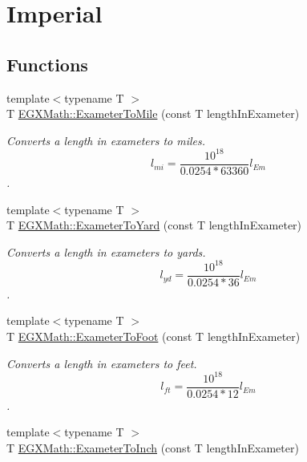 \hypertarget{group___e_g_x_math-_conversions-_length_conversions-_s_i-_exameter-_imperial}{}\section{Imperial}
\label{group___e_g_x_math-_conversions-_length_conversions-_s_i-_exameter-_imperial}
\subsection*{Functions}
\begin{DoxyCompactItemize}
\item 
{\footnotesize template$<$typename T $>$ }\\T \mbox{\hyperlink{group___e_g_x_math-_conversions-_length_conversions-_s_i-_exameter-_imperial_ga352ae8fb1bf743a0978e3ed05b06b61b}{E\+G\+X\+Math\+::\+Exameter\+To\+Mile}} (const T length\+In\+Exameter)
\begin{DoxyCompactList}\small\item\em Converts a length in exameters to miles. \[ l_{mi}=\frac{10^{18}}{0.0254 * 63360} l_{Em} \]. \end{DoxyCompactList}\item 
{\footnotesize template$<$typename T $>$ }\\T \mbox{\hyperlink{group___e_g_x_math-_conversions-_length_conversions-_s_i-_exameter-_imperial_gaaa37d3bd7aa2c3a8756ca2e2830bf8ac}{E\+G\+X\+Math\+::\+Exameter\+To\+Yard}} (const T length\+In\+Exameter)
\begin{DoxyCompactList}\small\item\em Converts a length in exameters to yards. \[ l_{yd}= \frac{10^{18}}{0.0254 * 36} l_{Em} \]. \end{DoxyCompactList}\item 
{\footnotesize template$<$typename T $>$ }\\T \mbox{\hyperlink{group___e_g_x_math-_conversions-_length_conversions-_s_i-_exameter-_imperial_gac6057a24ad10c84b86ec52c9a37f916b}{E\+G\+X\+Math\+::\+Exameter\+To\+Foot}} (const T length\+In\+Exameter)
\begin{DoxyCompactList}\small\item\em Converts a length in exameters to feet. \[ l_{ft}= \frac{10^{18}}{0.0254 * 12} l_{Em} \]. \end{DoxyCompactList}\item 
{\footnotesize template$<$typename T $>$ }\\T \mbox{\hyperlink{group___e_g_x_math-_conversions-_length_conversions-_s_i-_exameter-_imperial_gabf4408961480eb2b76d2f5c588df128e}{E\+G\+X\+Math\+::\+Exameter\+To\+Inch}} (const T length\+In\+Exameter)

\end{DoxyCompactItemize}
